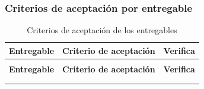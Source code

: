 \subsubsection{Criterios de aceptación por entregable}

{\footnotesize
\begin{xltabular}{\textwidth}{|>{\raggedright\arraybackslash}p{3.0cm}|X|>{\raggedright\arraybackslash}p{2.6cm}|}
    \caption{Criterios de aceptación de los entregables}
    \label{tab:criterios_aceptacion} \\
    \hline
    \textbf{Entregable} & \textbf{Criterio de aceptación} & \textbf{Verifica} \\
    \hline
    \endfirsthead

     \\
    \hline
    \textbf{Entregable} & \textbf{Criterio de aceptación} & \textbf{Verifica} \\
    \hline
    \endhead

     \\
    \endfoot

    \endlastfoot


\end{xltabular}}
